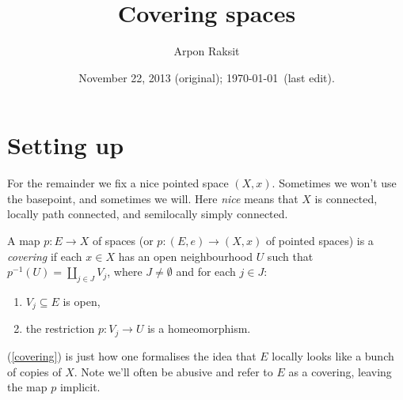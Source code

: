 


\title{Covering spaces}
\author{Arpon Raksit}
\date{November 22, 2013 (original); \today\ (last edit).}


\maketitle
\thispagestyle{fancy}


\section{Setting up}

\begin{notation}
  For the remainder we fix a nice pointed space $(X,x)$. Sometimes we
  won't use the basepoint, and sometimes we will. Here \emph{nice}
  means that $X$ is connected, locally path connected, and semilocally
  simply connected.
\end{notation}

\begin{definition}
  \label{covering}
  A map $p : E \to X$ of spaces (or $p : (E,e) \to (X,x)$ of pointed
  spaces) is a \emph{covering} if each $x \in X$ has an open
  neighbourhood $U$ such that $p^{-1}(U) = \coprod_{j \in J} V_j$,
  where $J \ne \emptyset$ and for each $j \in J$:
  \begin{enumerate}
  \item $V_j \subseteq E$ is open,
  \item the restriction $p : V_j \to U$ is a homeomorphism.
  \end{enumerate}
\end{definition}

\begin{remarks}
  (\ref{covering}) is just how one formalises the idea that $E$
  locally looks like a bunch of copies of $X$. Note we'll often be
  abusive and refer to $E$ as a covering, leaving the map $p$
  implicit.
\end{remarks}

\newcommand{\Cov}{\operatorname{Cov}}
\newcommand{\Gal}{\operatorname{Gal}}

